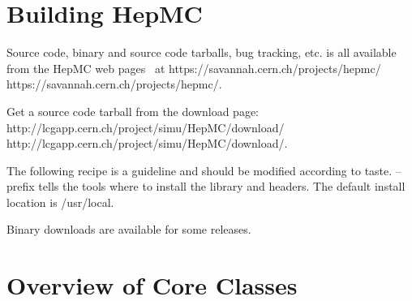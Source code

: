 \documentclass[11pt,letterpaper]{article}
\begin{document}
\section{Building HepMC}

Source code, binary and source code tarballs, bug tracking, etc. is
all available from the HepMC web pages~\cite{LCGHepMC} at  
\htmladdnormallink
{https://savannah.cern.ch/projects/hepmc/}
{https://savannah.cern.ch/projects/hepmc/}.

Get a source code tarball from the download page:
\htmladdnormallink
{http://lcgapp.cern.ch/project/simu/HepMC/download/}
{http://lcgapp.cern.ch/project/simu/HepMC/download/}.

\vspace{0.5cm}
\begin{myitemize}
 {The following recipe is a guideline and should be modified according to taste.}
    {--prefix tells the tools where to install the library and headers.
     The default install location is /usr/local.}
\end{myitemize}

Binary downloads are available for some releases.

%
%

\section{Overview of Core Classes}
%
%
\end{document}
